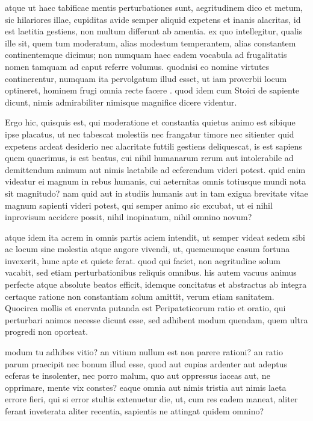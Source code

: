  atque ut haec tabificae mentis perturbationes sunt, aegritudinem dico et metum, sic hilariores illae, cupiditas avide semper aliquid expetens et inanis alacritas, id est laetitia gestiens, non multum differunt ab amentia. ex quo intellegitur, qualis ille sit, quem tum moderatum, alias modestum temperantem, alias constantem continentemque dicimus; non numquam haec eadem vocabula ad frugalitatis nomen tamquam ad caput referre volumus. quodnisi eo nomine virtutes continerentur, numquam ita pervolgatum illud esset, ut iam proverbii locum optineret, hominem frugi omnia recte facere . quod idem cum Stoici de sapiente dicunt, nimis admirabiliter nimisque magnifice dicere videntur.

 Ergo hic, quisquis est, qui moderatione et constantia quietus animo est sibique ipse placatus, ut nec tabescat molestiis nec frangatur timore nec sitienter quid expetens ardeat desiderio nec alacritate futtili gestiens deliquescat, is est sapiens quem quaerimus, is est beatus, cui nihil humanarum rerum aut intolerabile ad demittendum animum aut nimis laetabile ad ecferendum videri potest. quid enim videatur ei magnum in rebus humanis, cui aeternitas omnis totiusque mundi nota sit magnitudo? nam quid aut in studiis humanis aut in tam exigua brevitate vitae magnum sapienti videri potest, qui semper animo sic excubat, ut ei nihil inprovisum accidere possit, nihil inopinatum, nihil omnino novum?

 atque idem ita acrem in omnis partis aciem intendit, ut semper videat sedem sibi ac locum sine molestia atque angore vivendi, ut, quemcumque casum fortuna invexerit, hunc apte et quiete ferat. quod qui faciet, non aegritudine solum vacabit, sed etiam perturbationibus reliquis omnibus. his autem vacuus animus perfecte atque absolute beatos efficit, idemque concitatus et abstractus ab integra certaque ratione non constantiam solum amittit, verum etiam sanitatem. Quocirca mollis et enervata putanda est Peripateticorum ratio et oratio, qui perturbari animos necesse dicunt esse, sed adhibent modum quendam, quem ultra progredi non oporteat.

 modum tu adhibes vitio? an vitium nullum est non parere rationi? an ratio parum praecipit nec bonum illud esse, quod aut cupias ardenter aut adeptus ecferas te insolenter, nec porro malum, quo aut oppressus iaceas aut, ne opprimare, mente vix constes? eaque omnia aut nimis tristia aut nimis laeta errore fieri, qui si error stultis extenuetur die, ut, cum res eadem maneat, aliter ferant inveterata aliter recentia, sapientis ne attingat quidem omnino?

